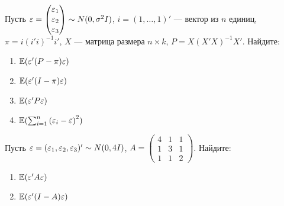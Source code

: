 \documentclass[pdftex,11pt,openany]{book}\usepackage[]{graphicx}\usepackage[]{color}
\begin{document}
\begin{problem}
Пусть $\varepsilon = \begin{pmatrix} \varepsilon_1 \\ \varepsilon_2 \\ \varepsilon_3 \end{pmatrix} \sim N (0,\sigma^2 I)$, $i = (1,\dots,1)'$ --- вектор из $n$ единиц, $\pi=i(i'i)^{-1}i'$,
$X$ --- матрица размера ${n \times k}$, $P = X(X'X)^{-1}X'$. Найдите:
\begin{enumerate}
\item $\mathbb{E}(\varepsilon'(P - \pi)\varepsilon)$ 
\item $\mathbb{E}(\varepsilon'(I - \pi)\varepsilon)$
\item $\mathbb{E}(\varepsilon'P \varepsilon)$
\item $\mathbb{E}(\sum_{i=1}^n {(\varepsilon_i - \bar{\varepsilon})}^2)$
\end{enumerate}
\end{problem}

\begin{solution}
\end{solution}

\begin{problem}
Пусть $\varepsilon = (\varepsilon_1, \varepsilon_2, \varepsilon_3)'\sim N (0,4I)$, $A = \begin{pmatrix} 4 & 1 & 1 \\ 1 & 3 & 1 \\ 1 & 1 & 2 \end{pmatrix}$. Найдите:




\begin{enumerate}
\item $\mathbb{E}(\varepsilon'A\varepsilon)$
\item $\mathbb{E}(\varepsilon'(I - A)\varepsilon)$ 
\end{enumerate}
\end{problem}

\begin{solution}
\end{solution}
\end{document}
